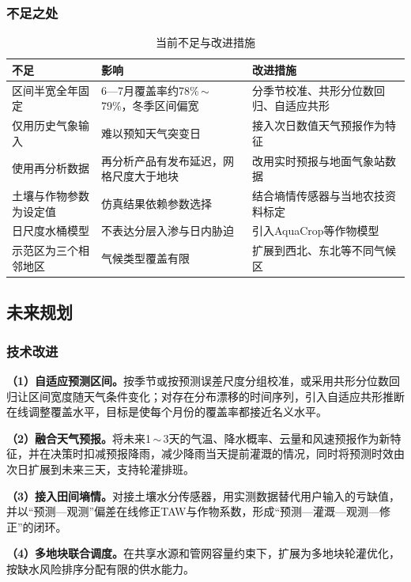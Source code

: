 \subsubsection{不足之处}
\begin{table}[H]\centering\small
\caption{当前不足与改进措施}\label{tab:limitations}
\begin{tabularx}{\linewidth}{@{}p{.24\linewidth}XX@{}}\toprule
不足 & 影响 & 改进措施\\\midrule
区间半宽全年固定 & 6—7月覆盖率约78\%\,$\sim$\,79\%，冬季区间偏宽 & 分季节校准、共形分位数回归\cite{cqr}、自适应共形\cite{aci}\\
仅用历史气象输入 & 难以预知天气突变日 & 接入次日数值天气预报作为特征\\
使用再分析数据 & 再分析产品有发布延迟，网格尺度大于地块 & 改用实时预报与地面气象站数据\\
土壤与作物参数为设定值 & 仿真结果依赖参数选择 & 结合墒情传感器与当地农技资料标定\\
日尺度水桶模型 & 不表达分层入渗与日内胁迫 & 引入AquaCrop等作物模型\cite{aquacrop}\\
示范区为三个相邻地区 & 气候类型覆盖有限 & 扩展到西北、东北等不同气候区\\\bottomrule
\end{tabularx}
\end{table}

\subsection{未来规划}
\subsubsection{技术改进}
\textbf{（1）自适应预测区间。}按季节或按预测误差尺度分组校准，或采用共形分位数回归\cite{cqr}让区间宽度随天气条件变化；对存在分布漂移的时间序列，引入自适应共形推断\cite{aci}在线调整覆盖水平，目标是使每个月份的覆盖率都接近名义水平。

\textbf{（2）融合天气预报。}将未来1\,$\sim$\,3天的气温、降水概率、云量和风速预报作为新特征，并在决策时扣减预报降雨，减少降雨当天提前灌溉的情况，同时将预测时效由次日扩展到未来三天，支持轮灌排班。

\textbf{（3）接入田间墒情。}对接土壤水分传感器，用实测数据替代用户输入的亏缺值，并以“预测—观测”偏差在线修正TAW与作物系数，形成“预测—灌溉—观测—修正”的闭环。

\textbf{（4）多地块联合调度。}在共享水源和管网容量约束下，扩展为多地块轮灌优化，按缺水风险排序分配有限的供水能力。


